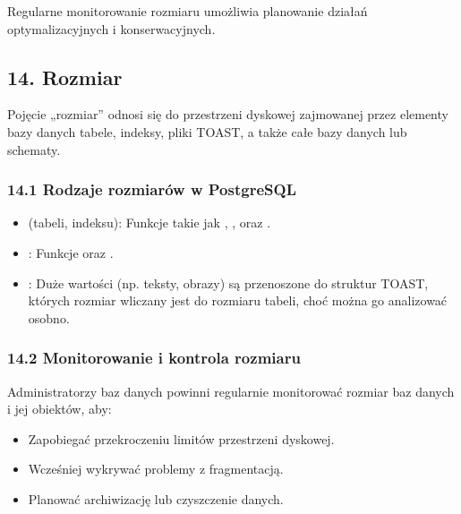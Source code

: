 \documentclass[a4paper,11pt,openany,english]{sphinxmanual}
\begin{document}
\sphinxAtStartPar
Regularne monitorowanie rozmiaru umożliwia planowanie działań optymalizacyjnych i konserwacyjnych.


\subsection{14. Rozmiar}
\label{\detokenize{rozdzial2/Konfiguracja_baz_danych/Konfiguracja_baz_danych:rozmiar}}
\sphinxAtStartPar
Pojęcie „rozmiar” odnosi się do przestrzeni dyskowej zajmowanej przez elementy bazy danych \textendash{} tabele, indeksy, pliki TOAST, a także całe bazy danych lub schematy.


\subsubsection{14.1 Rodzaje rozmiarów w PostgreSQL}
\label{\detokenize{rozdzial2/Konfiguracja_baz_danych/Konfiguracja_baz_danych:rodzaje-rozmiarow-w-postgresql}}\begin{itemize}
\item {} 
\sphinxAtStartPar
{} (tabeli, indeksu):
Funkcje takie jak , ,  oraz .

\item {} 
\sphinxAtStartPar
{}:
Funkcje  oraz .

\item {} 
\sphinxAtStartPar
{}:
Duże wartości (np. teksty, obrazy) są przenoszone do struktur TOAST, których rozmiar wliczany jest do rozmiaru tabeli, choć można go analizować osobno.

\end{itemize}


\subsubsection{14.2 Monitorowanie i kontrola rozmiaru}
\label{\detokenize{rozdzial2/Konfiguracja_baz_danych/Konfiguracja_baz_danych:monitorowanie-i-kontrola-rozmiaru}}
\sphinxAtStartPar
Administratorzy baz danych powinni regularnie monitorować rozmiar baz danych i jej obiektów, aby:
\begin{itemize}
\item {} 
\sphinxAtStartPar
Zapobiegać przekroczeniu limitów przestrzeni dyskowej.

\item {} 
\sphinxAtStartPar
Wcześniej wykrywać problemy z fragmentacją.

\item {} 
\sphinxAtStartPar
Planować archiwizację lub czyszczenie danych.

\end{itemize}
\end{document}
